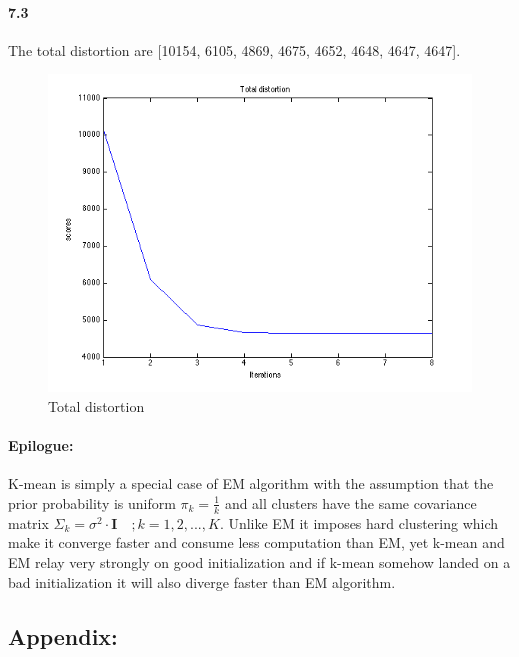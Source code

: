 \documentclass[a4paper]{article}
\begin{document}
\paragraph{7.3} The total distortion are [10154,    6105,    4869,    4675,    4652,    4648,    4647,    4647]. \\

	\begin{figure}[H]
	  \centering
	    \includegraphics[scale=.57]{images/distortion.png}
	  \caption{Total distortion}
	\end{figure}
	
\paragraph{Epilogue: } K-mean is simply a special case of EM algorithm with the assumption that the prior probability is uniform $\pi_k = \frac{1}{k}$ and all clusters have the same covariance matrix $\Sigma_k = \sigma^2 \cdot \mathbf{I} \quad; k=1,2,...,K$. Unlike EM it imposes hard clustering which make it converge faster and consume less computation than EM, yet k-mean and EM relay very strongly on good initialization and if k-mean somehow landed on a bad initialization it will also diverge faster than EM algorithm.

\newpage
\subsection*{Appendix:}
	
	
		
	
	
	
	
		
\end{document}
